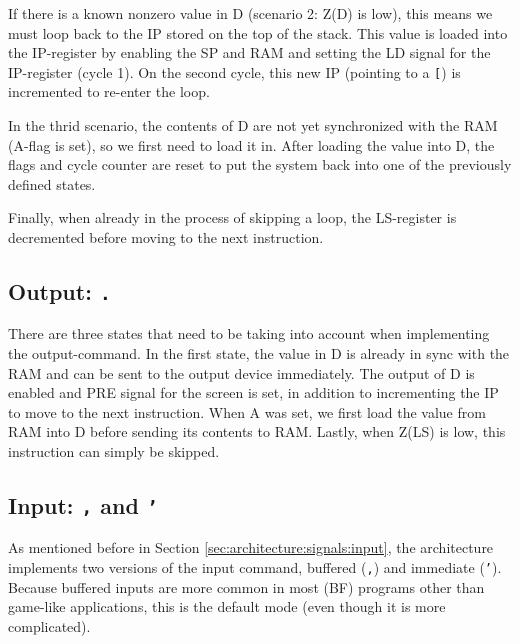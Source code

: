 If there is a known nonzero value in D (scenario 2: Z(D) is low), this means we must loop back to the IP stored on the top of the stack. This value is loaded into the IP-register by enabling the SP and RAM and setting the LD signal for the IP-register (cycle 1). On the second cycle, this new IP (pointing to a \texttt{[}) is incremented to re-enter the loop.
  
In the thrid scenario, the contents of D are not yet synchronized with the RAM (A-flag is set), so we first need to load it in. After loading the value into D, the flags and cycle counter are reset to put the system back into one of the previously defined states.

Finally, when already in the process of skipping a loop, the LS-register is decremented before moving to the next instruction.

\subsection{Output: \texttt{.}}
There are three states that need to be taking into account when implementing the output-command. In the first state, the value in D is already in sync with the RAM and can be sent to the output device immediately. The output of D is enabled and PRE signal for the screen is set, in addition to incrementing the IP to move to the next instruction. When A was set, we first load the value from RAM into D before sending its contents to RAM. Lastly, when Z(LS) is low, this instruction can simply be skipped.

\subsection{Input: \texttt{,} and \texttt{'}}
As mentioned before in Section \ref{sec:architecture:signals:input}, the architecture implements two versions of the input command, buffered (\texttt{,}) and immediate (\texttt{'}). Because buffered inputs are more common in most (BF) programs other than game-like applications, this is the default mode (even though it is more complicated).

